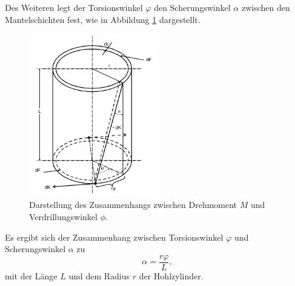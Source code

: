 Des Weiteren legt der Torsionswinkel $\varphi$ den Scherungswinkel $\alpha$ zwischen den
Mantelschichten fest, wie in Abbildung \ref{fig:verdrilltorsion} dargestellt.
\begin{figure}
	\centering
	\includegraphics[width=0.5\textwidth]{Bilder/Zylinder_Verdrillung.png}
	\caption{Darstellung des Zusammenhangs zwischen Drehmoment $M$ und Verdrillungswinkel $\phi$. \cite{Anleitung}}
	\label{fig:verdrilltorsion}
\end{figure}
Es ergibt sich der Zusammenhang zwischen Torsionswinkel $\varphi$ und Scherungswinkel $\alpha$
zu
\begin{equation}
	\label{eqn:variphi}
	\alpha = \frac{r \varphi}{L} \mathrm{,}
\end{equation}
mit der Länge $L$ und dem Radius $r$ der Hohlzylinder.

